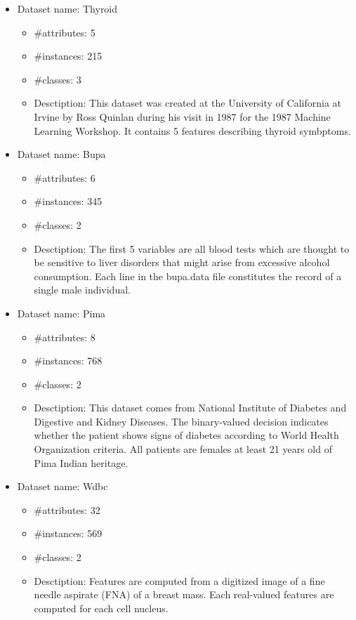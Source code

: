 \begin{itemize}
    \item Dataset name: Thyroid
        \begin{itemize}
            \item \#attributes: 5
            \item \#instances: 215
            \item \#classes: 3
            \item Desctiption:
                This dataset was created at the University of
                California at Irvine by Ross Quinlan during his visit in 1987 for
                the 1987 Machine Learning Workshop. It contains 5 features
                describing thyroid symbptoms.
        \end{itemize}

    \item Dataset name: Bupa
        \begin{itemize}
            \item \#attributes: 6
            \item \#instances: 345
            \item \#classes: 2
            \item Desctiption:
                The first 5 variables are all blood tests which are thought to
                be sensitive to liver disorders that might arise from excessive 
                alcohol consumption. Each line in the bupa.data file constitutes
                the record of a single male individual. 
        \end{itemize}

    \item Dataset name: Pima
        \begin{itemize}
            \item \#attributes: 8
            \item \#instances: 768
            \item \#classes: 2
            \item Desctiption:
                This dataset comes from National Institute of Diabetes and Digestive and
                Kidney Diseases. The binary-valued decision indicates whether the
                patient shows signs of diabetes according to World Health Organization
                criteria. All patients are females at least 21 years old of Pima Indian heritage.
        \end{itemize}

    \item Dataset name: Wdbc
        \begin{itemize}
            \item \#attributes: 32
            \item \#instances: 569
            \item \#classes: 2
            \item Desctiption:
                Features are computed from a digitized image of a fine needle aspirate (FNA) of a breast mass.
                Each real-valued features are computed for each cell nucleus.
        \end{itemize}
\end{itemize}

